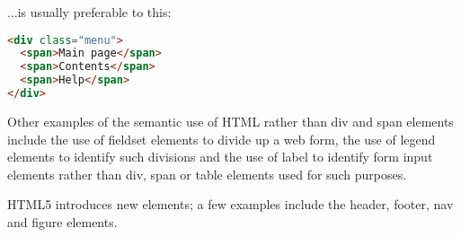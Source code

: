 ...is usually preferable to this:

\begin{lstlisting}[language=HTML]
<div class="menu">
  <span>Main page</span>
  <span>Contents</span>
  <span>Help</span>
</div>
\end{lstlisting}


Other examples of the semantic use of HTML rather than div and span elements include the use of fieldset elements to divide up a web form, the use of legend elements to identify such divisions and the use of label to identify form input elements rather than div, span or table elements used for such purposes.

HTML5 introduces new elements; a few examples include the header, footer, nav and figure elements.



































































